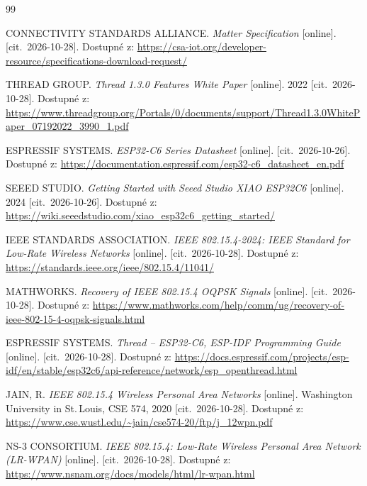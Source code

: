 

\begin{thebibliography}{99}

CONNECTIVITY STANDARDS ALLIANCE. \emph{Matter Specification}
[online]. [cit.~2026-10-28].
Dostupné z: \url{https://csa-iot.org/developer-resource/specifications-download-request/}

THREAD GROUP. \emph{Thread 1.3.0 Features White Paper}
[online]. 2022 [cit.~2026-10-28].
Dostupné z: \url{https://www.threadgroup.org/Portals/0/documents/support/Thread1.3.0WhitePaper_07192022_3990_1.pdf}

ESPRESSIF SYSTEMS. \emph{ESP32-C6 Series Datasheet}
[online]. [cit.~2026-10-26].
Dostupné z: \url{https://documentation.espressif.com/esp32-c6_datasheet_en.pdf}

SEEED STUDIO. \emph{Getting Started with Seeed Studio XIAO ESP32C6}
[online]. 2024 [cit.~2026-10-26].
Dostupné z: \url{https://wiki.seeedstudio.com/xiao_esp32c6_getting_started/}

IEEE STANDARDS ASSOCIATION. \emph{IEEE 802.15.4-2024: IEEE Standard for Low-Rate Wireless Networks}
[online]. [cit.~2026-10-28].
Dostupné z: \url{https://standards.ieee.org/ieee/802.15.4/11041/}

MATHWORKS. \emph{Recovery of IEEE 802.15.4 OQPSK Signals}
[online]. [cit.~2026-10-28].
Dostupné z: \url{https://www.mathworks.com/help/comm/ug/recovery-of-ieee-802-15-4-oqpsk-signals.html}

ESPRESSIF SYSTEMS. \emph{Thread -- ESP32-C6, ESP-IDF Programming Guide}
[online]. [cit.~2026-10-28].
Dostupné z: \url{https://docs.espressif.com/projects/esp-idf/en/stable/esp32c6/api-reference/network/esp_openthread.html}

JAIN, R. \emph{IEEE 802.15.4 Wireless Personal Area Networks}
[online]. Washington University in St.\,Louis, CSE 574, 2020 [cit.~2026-10-28].
Dostupné z: \url{https://www.cse.wustl.edu/~jain/cse574-20/ftp/j_12wpn.pdf}

NS-3 CONSORTIUM. \emph{IEEE 802.15.4: Low-Rate Wireless Personal Area Network (LR-WPAN)}
[online]. [cit.~2026-10-28].
Dostupné z: \url{https://www.nsnam.org/docs/models/html/lr-wpan.html}


\end{thebibliography}
